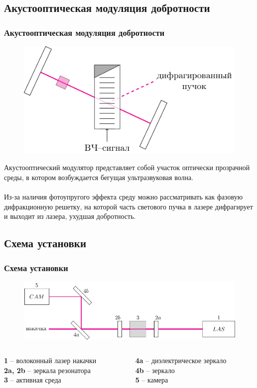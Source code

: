 \documentclass[10pt,pdf,hyperref={unicode}, dvipsnames]{beamer}
\newcommand\frametitless[1]{\subsection{#1}\frametitle{#1}}
\begin{document}
\begin{frame}[t]
	\frametitless{Акустооптическая модуляция добротности}
			\begin{figure}[h]
				\centering
				\includegraphics[]{images/aom}
			\end{figure}	
Акустооптический модулятор представляет собой участок оптически про­зрачной среды, в котором возбуждается бегущая ультразвуковая волна.
\\~\\
Из-за наличия фотоупругого эффекта среду можно рассматривать как фазовую дифракционную решетку, на которой часть светового пучка в лазере дифрагирует и выходит из лазера, ухудшая добротность.
\end{frame}
\begin{frame}
	\frametitless{Схема установки}
	\begin{figure}[tb]
		\centering
		\includegraphics[width=1\textwidth]{images/chem}
	\end{figure}
	\vspace{1cm}
	\begin{columns}
		\begin{column}{0.4\textwidth}
			\textbf{1} -- волоконный лазер накачки\\ 
			\textbf{2a, 2b} -- зеркала резонатора\\
			\textbf{3} -- активная среда
		\end{column}
		\begin{column}{0.4\textwidth}
			\textbf{4a} -- диэлектрическое зеркало\\
			\textbf{4b} -- зеркало\\
			\textbf{5} -- камера
		\end{column}
	\end{columns}
\end{frame}
\end{document}

